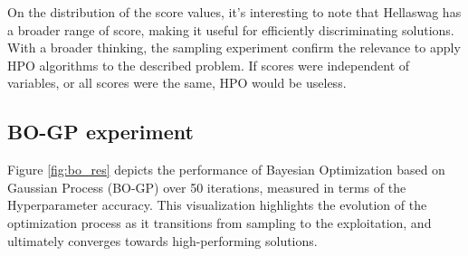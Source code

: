 \documentclass[runningheads]{llncs}
\begin{document}
On the distribution of the score values, it's interesting to note that Hellaswag has a broader range of score, making it useful for efficiently discriminating solutions.  With a broader thinking, the sampling experiment confirm the relevance to apply HPO algorithms to the described problem. If scores were independent of variables, or all scores were the same, HPO would be useless. 

\subsection{BO-GP experiment}
\label{sec:bo_exp}
Figure \ref{fig:bo_res} depicts the performance of Bayesian Optimization based on Gaussian Process (BO-GP) over 50 iterations, measured in terms of the Hyperparameter accuracy. This visualization highlights the evolution of the optimization process as it transitions from sampling to the exploitation, and ultimately converges towards high-performing solutions.
\end{document}
